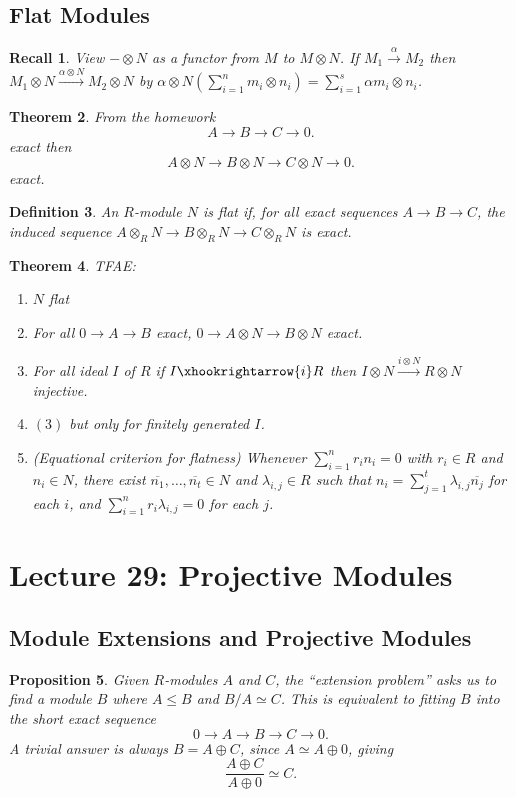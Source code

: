 \documentclass[a4paper,12pt]{article}
\newtheorem{thm}{Theorem}[section]
\newtheorem{defn}[thm]{Definition}
\newtheorem{rec}[thm]{Recall}
\newtheorem{prop}[thm]{Proposition}
\begin{document}
\subsection{Flat Modules}
\begin{rec}
    View $-\otimes N$ as a functor from $M$ to $M\otimes N$. If $M_1\xrightarrow{\alpha} M_2$ then $M_1\otimes N\xrightarrow{\alpha\otimes N} M_2 \otimes N$ by $\alpha\otimes N \left( \sum_{i=1}^n m_i \otimes n_i \right)=\sum_{i=1}^s \alpha m_i \otimes n_i$. 
\end{rec}
\begin{thm}
    From the homework \[
        A\to B\to C\to 0
    .\]  exact then \[
    A\otimes N\to B\otimes N\to C\otimes N\to 0
    .\] exact. 
\end{thm}
\begin{defn}
    An $R$-module $N$ is flat if, for all exact sequences $A \to B \to C$, the induced sequence $A \otimes_R N \to B \otimes_R N \to C \otimes_R N$ is exact.
\end{defn}
\begin{thm}
    TFAE: 
    \begin{enumerate}
        \item $N$ flat
        \item For all $0\to A\to B$ exact, $0\to A\otimes N\to B\otimes N$ exact. 
        \item For all ideal $I$ of $R$ if $I\xhookrightarrow{i} R$ then $I\otimes N \xrightarrow{i\otimes N} R\otimes N$ injective. 
        \item $(3)$ but only for finitely generated $I$. 
        \item (Equational criterion for flatness) Whenever $\sum_{i=1}^n r_i n_i=0$ with $r_i\in R$ and $n_i\in N$, there exist $\overline{n_1},\dots,\overline{n_t}\in N$ and $\lambda_{i,j}\in R$ such that $n_i=\sum_{j=1}^t \lambda_{i,j}\overline{n_j}$ for each $i$, and $\sum_{i=1}^n r_i \lambda_{i,j}=0$ for each $j$.
    \end{enumerate}
\end{thm}
\newpage
\section{Lecture 29: Projective Modules}
\subsection{Module Extensions and Projective Modules}

\begin{prop}
    Given $R$-modules $A$ and $C$, the ``extension problem'' asks us to find a module $B$ where $A \leq B$ and $B/A \simeq C$. This is equivalent to fitting $B$ into the short exact sequence 
    $$
    0 \to A \to B \to C \to 0.
    $$ 
    A trivial answer is always $B = A \oplus C$, since $A \simeq A \oplus 0$, giving 
    $$
    \frac{A \oplus C}{A \oplus 0} \simeq C.
    $$ 
\end{prop}
\end{document}
